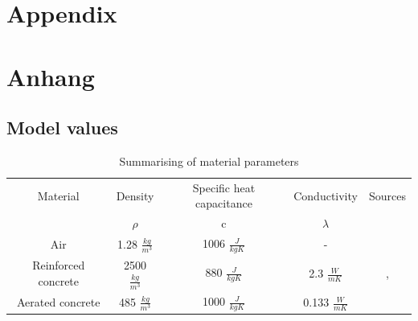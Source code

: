

{\chapter{Appendix}}    %
{\chapter{Anhang}}      %
\label{chap:appendix}

\section{Model values}
\label{sec:appendix:Modelvalues}

\begin{table}[H]
    \centering
    \begin{tabular}{c|c|c|c|c}
        Material &  Density & Specific heat capacitance & Conductivity & Sources\\
        &$\rho$ & c & $\lambda$&\\
         \hline
         Air & 1.28 $\frac{kg}{m^3}$ & 1006 $\frac{J}{kg K}$ & - &\cite{Weigand.2016}\\
         Reinforced concrete & 2500 $\frac{kg}{m^3}$ & 880 $\frac{J}{kg K}$ &2.3 $\frac{W}{m K}$&\cite{AntonSchweizer.12.10.2021}, \cite{AntonSchweizer.12.10.2021b}\\
         Aerated concrete & 485 $\frac{kg}{m^3}$ & 1000 $\frac{J}{kg K}$ & 0.133  $\frac{W}{m K}$&\cite{GhaziWakili.2015}\\
    \end{tabular}
    \caption{Summarising of material parameters}
    \label{tab:Summarising of material parameters}
\end{table} 

